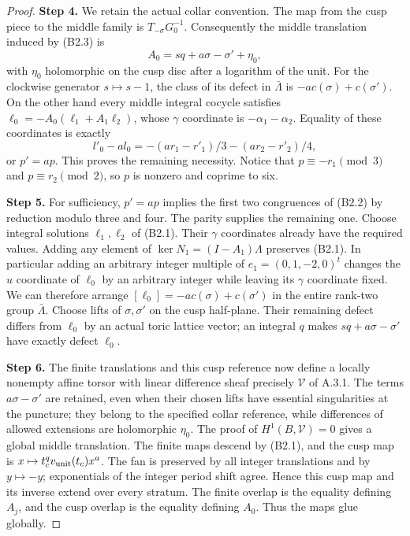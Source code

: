 \begin{proof}
\par\smallskip\noindent\textbf{Step 4.} We retain the actual collar convention. The map from the cusp piece to the middle family is $T_{-\sigma}G_0^{-1}$. Consequently the middle translation induced by (B2.3) is
\[
 A_0=sq+a\sigma-\sigma'+\eta_0,
\]
with $\eta_0$ holomorphic on the cusp disc after a logarithm of the unit. For the clockwise generator $s\mapsto s-1$, the class of its defect in $\bar\Lambda$ is $-a c(\sigma)+c(\sigma')$. On the other hand every middle integral cocycle satisfies
$\ell_0=-A_0(\ell_1+A_1\ell_2)$, whose $\gamma$ coordinate is $-\alpha_1-\alpha_2$. Equality of these coordinates is exactly
\[
 l'_0-a l_0=-(ar_1-r'_1)/3-(ar_2-r'_2)/4,
\]
or $p'=ap$. This proves the remaining necessity. Notice that $p\equiv-r_1\pmod3$ and $p\equiv r_2\pmod2$, so $p$ is nonzero and coprime to six.

\par\smallskip\noindent\textbf{Step 5.} For sufficiency, $p'=ap$ implies the first two congruences of (B2.2) by reduction modulo three and four. The parity supplies the remaining one. Choose integral solutions $\ell_1,\ell_2$ of (B2.1). Their $\gamma$ coordinates already have the required values. Adding any element of $\ker N_1=(I-A_1)\Lambda$ preserves (B2.1). In particular adding an arbitrary integer multiple of $e_1=(0,1,-2,0)^t$ changes the $\widehat u$ coordinate of $\ell_0$ by an arbitrary integer while leaving its $\gamma$ coordinate fixed. We can therefore arrange
$[\ell_0]=-a c(\sigma)+c(\sigma')$ in the entire rank-two group $\bar\Lambda$. Choose lifts of $\sigma,\sigma'$ on the cusp half-plane. Their remaining defect differs from $\ell_0$ by an actual toric lattice vector; an integral $q$ makes $sq+a\sigma-\sigma'$ have exactly defect $\ell_0$.

\par\smallskip\noindent\textbf{Step 6.} The finite translations and this cusp reference now define a locally nonempty affine torsor with linear difference sheaf precisely $\mathcal V$ of A.3.1. The terms $a\sigma-\sigma'$ are retained, even when their chosen lifts have essential singularities at the puncture; they belong to the specified collar reference, while differences of allowed extensions are holomorphic $\eta_0$. The proof of $H^1(B,\mathcal V)=0$ gives a global middle translation. The finite maps descend by (B2.1), and the cusp map is $x\mapsto t_c^qv_{\rm unit}(t_c)x^a$. The fan is preserved by all integer translations and by $y\mapsto-y$; exponentials of the integer period shift agree. Hence this cusp map and its inverse extend over every stratum. The finite overlap is the equality defining $A_j$, and the cusp overlap is the equality defining $A_0$. Thus the maps glue globally.


\end{proof}
